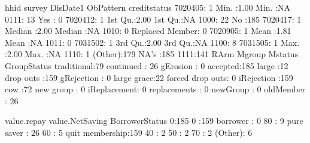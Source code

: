 \begin{Schunk}
\begin{Soutput}
      hhid         survey        DisDate1   ObPattern           creditstatus
 7020405:  1   Min.   :1.00   Min.   :NA    0111: 13   Yes            :  0  
 7020412:  1   1st Qu.:2.00   1st Qu.:NA    1000: 22   No             :185  
 7020417:  1   Median :2.00   Median :NA    1010:  0   Replaced Member:  0  
 7020905:  1   Mean   :1.81   Mean   :NA    1011:  0                        
 7031502:  1   3rd Qu.:2.00   3rd Qu.:NA    1100:  8                        
 7031505:  1   Max.   :2.00   Max.   :NA    1110:  1                        
 (Other):179                  NA's   :185   1111:141                        
          RArm                 Mgroup            Mstatus      GroupStatus 
 traditional:79   continued       : 26   gErosion    :  0   accepted:185  
 large      :12   drop outs       :159   gRejection  :  0                 
 large grace:22   forced drop outs:  0   iRejection  :159                 
 cow        :72   new group       :  0   iReplacement:  0                 
                  replacements    :  0   newGroup    :  0                 
                                         oldMember   : 26                 
                                                                          
 value.repay value.NetSaving         BorrowerStatus
 0:185       0      :159     borrower       :  0   
             80     :  9     pure saver     : 26   
             60     :  5     quit membership:159   
             40     :  2                           
             50     :  2                           
             70     :  2                           
             (Other):  6                           
\end{Soutput}
\end{Schunk}

